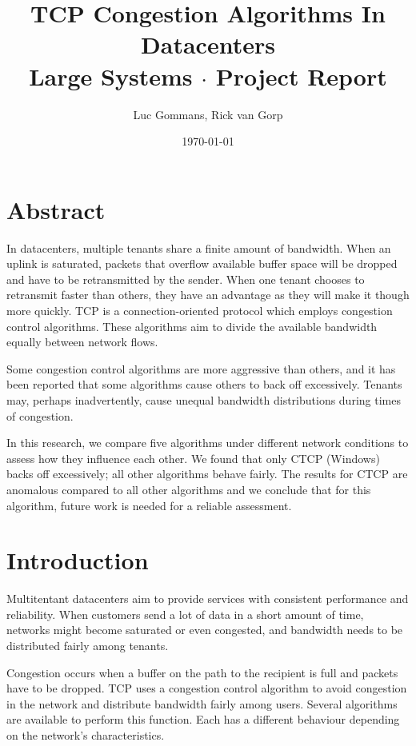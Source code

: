 \documentclass{article}
\title{TCP Congestion Algorithms In Datacenters \\
	{\large Large Systems $\cdot$ Project Report}
}
\date{\today{}}
\author{Luc Gommans, Rick van Gorp}
\begin{document}
\maketitle

\section*{Abstract}

In datacenters, multiple tenants share a finite amount of bandwidth. When an
uplink is saturated, packets that overflow available buffer space will be
dropped and have to be retransmitted by the sender. When one tenant chooses to
retransmit faster than others, they have an advantage as they will make it
though more quickly. TCP is a connection-oriented protocol which employs
congestion control algorithms. These algorithms aim to divide the available
bandwidth equally between network flows.

Some congestion control algorithms are more aggressive than others, and it has
been reported that some algorithms cause others to back off excessively.
Tenants may, perhaps inadvertently, cause unequal bandwidth distributions during
times of congestion.

In this research, we compare five algorithms under different network conditions
to assess how they influence each other. We found that only CTCP (Windows)
backs off excessively; all other algorithms behave fairly. The results for CTCP
are anomalous compared to all other algorithms and we conclude that for this
algorithm, future work is needed for a reliable assessment.


\newpage
\section{Introduction}

Multitentant datacenters aim to provide services with consistent performance
and reliability. When customers send a lot of data in a short amount of time,
networks might become saturated or even congested, and bandwidth needs to be
distributed fairly among tenants.

Congestion occurs when a buffer on the path to the recipient is full and
packets have to be dropped. TCP uses a congestion control algorithm to avoid
congestion in the network and distribute bandwidth fairly among users. Several
algorithms are available to perform this function. Each has a different behaviour
depending on the network's characteristics.
\end{document}
